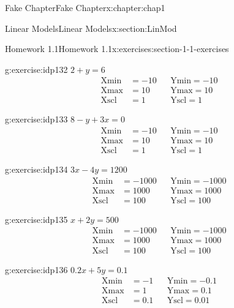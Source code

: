\documentclass[oneside,10pt,]{book}
\numberwithin{equation}{section}
\newcommand{\amp}{&}
\begin{document}
\begin{chapterptx}{Fake Chapter}{}{Fake Chapter}{}{}{x:chapter:chap1}
\begin{sectionptx}{Linear Models}{}{Linear Models}{}{}{x:section:LinMod}
\begin{exercises-subsection}{Homework 1.1}{}{Homework 1.1}{}{}{x:exercises:section-1-1-exercises}
\begin{exercisegroupcol}{2}
\begin{divisionexerciseegcol}{37}{}{}{g:exercise:idp132}%
\(2+y=6\)%
\begin{align*}
{\text{Xmin}} \amp = -10 \amp\amp {\text{Ymin}} = -10\\
{\text{Xmax}} \amp = 10 \amp\amp {\text{Ymax}} = 10\\
{\text{Xscl}} \amp = 1 \amp\amp {\text{Yscl}} = 1
\end{align*}
%
\end{divisionexerciseegcol}%
\begin{divisionexerciseegcol}{38}{}{}{g:exercise:idp133}%
\(8 - y + 3x = 0\)%
\begin{align*}
{\text{Xmin}} \amp = -10 \amp\amp {\text{Ymin}} = -10\\
{\text{Xmax}} \amp = 10 \amp\amp {\text{Ymax}} = 10\\
{\text{Xscl}} \amp = 1 \amp\amp {\text{Yscl}} = 1
\end{align*}
%
\end{divisionexerciseegcol}%
\begin{divisionexerciseegcol}{39}{}{}{g:exercise:idp134}%
\(3x - 4y = 1200\)%
\begin{align*}
{\text{Xmin}} \amp = -1000 \amp\amp {\text{Ymin}} = -1000\\
{\text{Xmax}} \amp = 1000 \amp\amp {\text{Ymax}} = 1000\\
{\text{Xscl}} \amp = 100 \amp\amp {\text{Yscl}} = 100
\end{align*}
%
\end{divisionexerciseegcol}%
\begin{divisionexerciseegcol}{40}{}{}{g:exercise:idp135}%
\(x + 2y = 500\)%
\begin{align*}
{\text{Xmin}} \amp = -1000 \amp\amp {\text{Ymin}} = -1000\\
{\text{Xmax}} \amp = 1000 \amp\amp {\text{Ymax}} = 1000\\
{\text{Xscl}} \amp = 100 \amp\amp {\text{Yscl}} = 100
\end{align*}
%
\end{divisionexerciseegcol}%
\begin{divisionexerciseegcol}{41}{}{}{g:exercise:idp136}%
\(0.2x + 5y = 0.1\)%
\begin{align*}
{\text{Xmin}} \amp = -1 \amp\amp {\text{Ymin}} = -0.1\\
{\text{Xmax}} \amp = 1 \amp\amp {\text{Ymax}} = 0.1\\
{\text{Xscl}} \amp = 0.1 \amp\amp {\text{Yscl}} = 0.01
\end{align*}

\end{divisionexerciseegcol}
\end{exercisegroupcol}
\end{exercises-subsection}
\end{sectionptx}
\end{chapterptx}
\end{document}
